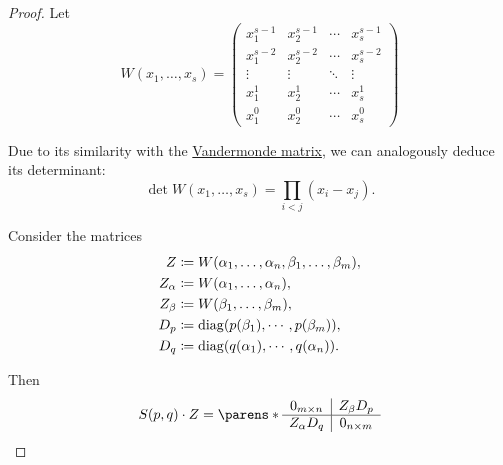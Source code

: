 \begin{proof}
  Let
  \begin{equation*}
    W(x_1, \ldots, x_s) =
    \begin{pmatrix}
      x_1^{s-1} & x_2^{s-1} & \cdots & x_s^{s-1} \\
      x_1^{s-2} & x_2^{s-2} & \cdots & x_s^{s-2} \\
      \vdots    & \vdots    & \ddots & \vdots    \\
      x_1^1     & x_2^1     & \cdots & x_s^1     \\
      x_1^0     & x_2^0     & \cdots & x_s^0
    \end{pmatrix}
  \end{equation*}

  Due to its similarity with the \hyperref[ex:vandermonde_matrix]{Vandermonde matrix}, we can analogously deduce its determinant:
  \begin{equation}\label{eq:thm:resultant_as_product/proof/w_determinant}
    \det W(x_1, \ldots, x_s) = \prod_{i < j} (x_i - x_j).
  \end{equation}

  Consider the matrices
  \begin{align*}
    Z        &\coloneqq W(\alpha_1, \ldots, \alpha_n, \beta_1, \ldots, \beta_m), \\
    Z_\alpha &\coloneqq W(\alpha_1, \ldots, \alpha_n), \\
    Z_\beta  &\coloneqq W(\beta_1, \ldots, \beta_m), \\
    D_p      &\coloneqq \op{diag}(p(\beta_1), \cdots, p(\beta_m)), \\
    D_q      &\coloneqq \op{diag}(q(\alpha_1), \cdots, q(\alpha_n)).
  \end{align*}

  Then
  \begin{equation}\label{eq:thm:resultant_as_product/proof/matrix_product}
    S(p, q) \cdot Z =
    \parens*
      {
        \begin{array}{c | c}
          0_{m \times n} & Z_\beta D_p   \\
          \hline
          Z_\alpha D_q   & 0_{n \times m}
        \end{array}
      }
  \end{equation}


\end{proof}
